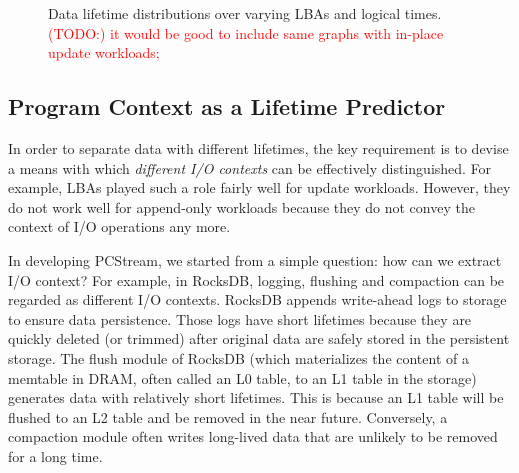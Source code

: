 \begin{figure}[t]
	\centering
	\vspace{-10pt}
	\caption{
		Data lifetime distributions over varying LBAs and logical times.
		\textcolor{red}{(TODO:) it would be good to include same graphs with
		in-place update workloads;}}
		\label{fig:lba_lifetime}
	\vspace{-15pt}
\end{figure}

\subsection{Program Context as a Lifetime Predictor}
In order to separate data with different lifetimes, the key requirement is to devise 
a means with which {\it different I/O contexts} can be effectively distinguished.  
For example, LBAs played such a role fairly well for update workloads.  
However, they do not work well for append-only workloads because 
they do not convey the context of I/O operations any more.  

In developing PCStream, we started from a simple question: 
how can we extract I/O context? 
For example, in RocksDB, logging, flushing and compaction can be regarded
as different I/O contexts.
RocksDB appends write-ahead logs to storage to ensure data
persistence.  Those logs have short lifetimes because they are quickly deleted
(or trimmed) after original data are safely stored in the persistent storage.
The flush module of RocksDB (which materializes the content of a memtable in
DRAM, often called an L0 table, to an L1 table in the storage) generates data
with relatively short lifetimes. This is because an L1 table will be flushed to
an L2 table and be removed in the near future. Conversely, a compaction module
often writes long-lived data that are unlikely to be removed for a long time.


